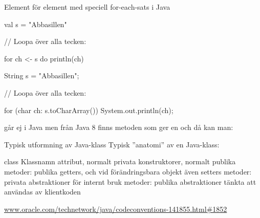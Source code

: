 \begin{Slide}{Element för element med speciell for-each-sats i Java}
\begin{multicols}{2}
\noindent{}
\begin{CodeSmall}[basicstyle=\ttfamily\SlideFontSize{6}{8},backgroundcolor=\color{white},
  frame=none]
val s = "Abbasillen"

// Loopa över alla tecken:

for ch <- s do println(ch)


\end{CodeSmall}

\columnbreak

\noindent{}
\begin{CodeSmall}[language=Java,basicstyle=\ttfamily\SlideFontSize{6}{8},backgroundcolor=\color{white},
  frame=none]
String s = "Abbasillen";

// Loopa över alla tecken:

for (char ch: s.toCharArray()) {
  System.out.println(ch);
}
\end{CodeSmall}
\end{multicols}

\pause
{\noindent\SlideFontSmall
{} går ej i Java men
från Java 8 finns metoden  som ger en  och då kan man: \\
 }
\end{Slide}






\begin{Slide}{Typisk utformning av Java-klass}
Typisk ''anatomi'' av en Java-klass:
\begin{Code}[language=Java]
class Klassnamn {
    attribut, normalt privata
    konstruktorer, normalt publika
    metoder: publika getters, och vid förändringsbara objekt även setters
    metoder: privata abstraktioner för internt bruk
    metoder: publika abstraktioner tänkta att användas av klientkoden
}
\end{Code}
\href{http://www.oracle.com/technetwork/java/codeconventions-141855.html#1852}{www.oracle.com/technetwork/java/codeconventions-141855.html\#1852}
\end{Slide}


